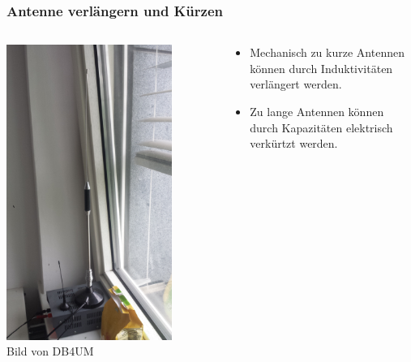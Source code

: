 \begin{frame}
  \frametitle{Antenne verlängern und Kürzen}
  \begin{columns}[c]
    \column[c]{5cm}
    \begin{center}
      \includegraphics[width=0.8\textwidth]{a09/Verkurzte_10m_Antenne.jpg}\\
      \tiny Bild von DB4UM
    \end{center}
    \column{5cm} \large
    \begin{center}
      \begin{itemize}
        \item Mechanisch zu kurze Antennen können durch Induktivitäten verlängert werden.
        \item Zu lange Antennen können durch Kapazitäten elektrisch verkürtzt werden.
      \end{itemize}
    \end{center}
  \end{columns}
\end{frame}

